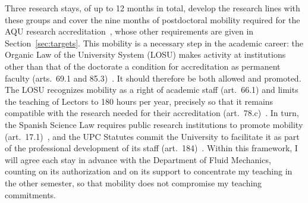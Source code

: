\documentclass[11pt]{article}
\begin{document}
Three research stays, of up to 12 months in total, develop the research lines with these groups
and cover the nine months of postdoctoral mobility required for the AQU research
accreditation~\cite{AQU2025}, whose other requirements are given in Section~\ref{sec:targets}.
This mobility is a necessary step in the academic career: the Organic Law of the University System
(LOSU) makes activity at institutions other than that of the doctorate a condition for
accreditation as permanent faculty (arts.~69.1 and 85.3)~\cite{LOSU2023}. It should therefore be
both allowed and promoted. The LOSU recognizes mobility as a right of academic staff (art.~66.1)
and limits the teaching of Lectors to 180 hours per year, precisely so that it remains compatible
with the research needed for their accreditation (art.~78.c)~\cite{LOSU2023}. In turn, the Spanish
Science Law requires public research institutions to promote mobility (art.~17.1)~\cite{LCTI2011},
and the UPC Statutes commit the University to facilitate it as part of the professional development
of its staff (art.~184)~\cite{UPCStatutes2025}. Within this framework, I will agree each stay in
advance with the Department of Fluid Mechanics, counting on its authorization and on its support to
concentrate my teaching in the other semester, so that mobility does not compromise my teaching
commitments.
\end{document}
